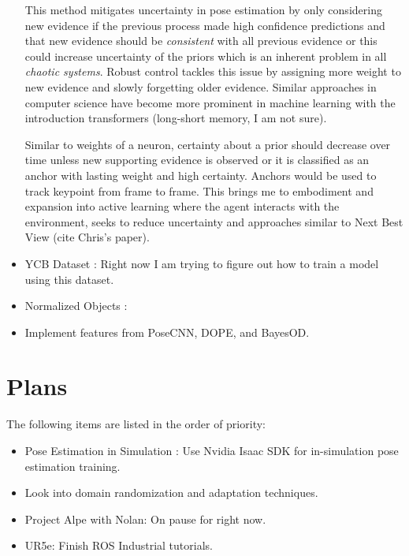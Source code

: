 \documentclass[11pt]{article}
\begin{document}
\begin{itemize}
      This method mitigates uncertainty in pose estimation by only considering
      new evidence if the previous process made high confidence predictions and that
      new evidence should be \textit{consistent} with all previous evidence or
      this could increase uncertainty of the priors which is an inherent
      problem in all \textit{chaotic systems}. Robust
      control tackles this issue by assigning more weight to new evidence and
      slowly forgetting older evidence. Similar approaches in computer science
      have become more prominent in machine learning with the introduction
      transformers (long-short memory, I am not sure).

      Similar to weights of a neuron, certainty about a prior should decrease
      over time unless new supporting evidence is observed or it is classified
      as an anchor with lasting weight and high certainty. Anchors would be
      used to track keypoint from frame to frame. This brings me to embodiment
      and expansion into active learning where the agent interacts with the
      environment, seeks to reduce uncertainty and approaches similar to
      Next Best View (cite Chris's paper).

      \item YCB Dataset \cite{calli2015ycb}: Right now I am trying to figure
      out how to train a model using this dataset.
      \item Normalized Objects \cite{Wang_2019_CVPR}:
      \item Implement features from PoseCNN, DOPE, and BayesOD.
\end{itemize}


\section{Plans}
The following items are listed in the order of priority:

\begin{itemize}
      \item Pose Estimation in Simulation \cite{NVIDIAIs75:online}: Use Nvidia
      Isaac SDK for in-simulation pose estimation training.
      \item Look into domain randomization and adaptation techniques.
      \item Project Alpe with Nolan: On pause for right now.
      \item UR5e: Finish ROS Industrial tutorials.
\end{itemize}
\end{document}
